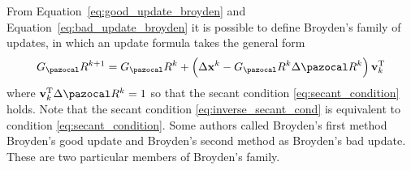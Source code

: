 From Equation~\eqref{eq:good_update_broyden} and Equation~\eqref{eq:bad_update_broyden} it is possible to define Broyden's family of updates, in which an update formula takes the general form
\begin{equation}
G_\pazocal R^{k+1}=G_\pazocal R^{k}+\left(\Delta \mathbf x^{k}-G_\pazocal R^{k} \Delta \pazocal R^{k}\right) \mathbf v_{k}^{\mathrm{T}}
\end{equation}
where \(\mathbf v_{k}^{\mathrm{T}} \Delta \pazocal R^{k}=1\) so that the secant condition \eqref{eq:secant_condition} holds.
Note that the secant condition \eqref{eq:inverse_secant_cond} is equivalent to condition \eqref{eq:secant_condition}.
Some authors called Broyden's first method Broyden's good update and Broyden's second method as Broyden's bad update.
These are two particular members of Broyden's family.

